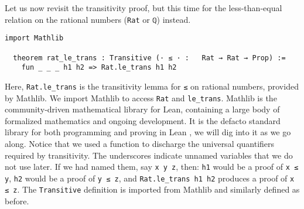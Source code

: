 Let us now revisit the transitivity proof, but this time for the less-than-equal relation on
the rational numbers (\lstinline[language=lean]|Rat| or \lstinline[language=lean]|ℚ|) instead.
\newpage
\begin{lstlisting}[language=lean]
  import Mathlib

  theorem rat_le_trans : Transitive (· ≤ · :   Rat → Rat → Prop) :=
    fun _ _ _ h1 h2 => Rat.le_trans h1 h2
\end{lstlisting}
Here, \lstinline[language=lean]|Rat.le_trans| is the transitivity lemma
for \lstinline[language=lean]|≤| on rational numbers, provided by Mathlib.
We import Mathlib to access \lstinline[language=lean]|Rat|
and \lstinline[language=lean]|le_trans|.
Mathlib is the community‑driven mathematical
library for Lean, containing a large body of formalized mathematics
and ongoing development.
It is the defacto standard library for both programming and proving
in Lean \cite{mathlib2020}, we will dig into it as we go along.
Notice that we used a function to discharge the universal
quantifiers required by transitivity. The underscores indicate
unnamed variables that we do not use later. If we had named
them, say \lstinline|x y z|, then:
\lstinline[language=lean]|h1| would be a proof of \lstinline[language=lean]|x ≤ y|,
\lstinline[language=lean]|h2| would be a proof of \lstinline[language=lean]|y ≤ z|,
and \lstinline[language=lean]|Rat.le_trans h1 h2| produces a proof of \lstinline[language=lean]|x ≤ z|.
The \lstinline[language=lean]|Transitive| definition is imported from Mathlib and similarly
defined as before.
